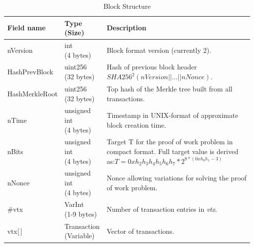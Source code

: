 \begin{table}[ht!]
	\centering
	\begin{tabular}{ | m{80pt} | >{\centering} m{60pt} | m{200pt} | }

		\hline
		\textbf{Field name} &
		\bigcell{c}{\textbf{Type} \\ \textbf{(Size)}} &
		\textbf{Description}\\ \hline\hline
    
		nVersion &
		\bigcell{c}{int \\ (4 bytes)} &
		Block format version (currently 2). \\ \hline
		
		HashPrevBlock &
		\bigcell{c}{uint256 \\ (32 bytes)} &
		Hash of previous block header \newline
		$SHA256^{2}(nVersion || \dots || nNonce)$. \\ \hline
	
		HashMerkleRoot &
		\bigcell{c}{uint256 \\ (32 bytes)} &
		Top hash of the Merkle tree built from all transactions. \\ \hline
		
		nTime &
		\bigcell{c}{unsigned int \\ (4 bytes)} &
		Timestamp in UNIX-format of approximate block creation time. \\ \hline
	
		nBits &
		\bigcell{c}{unsigned int \\ (4 bytes)} &
		Target T for the proof of work problem in compact format. Full target value is derived as:\newline$T = 0xh_{2}h_{3}h_{4}h_{5}h_{6}h_{7} * 2^{8*(0xh_{0}h_{1} - 3)}$\\ \hline
	
		nNonce &
		\bigcell{c}{unsigned int \\ (4 bytes)} &
		Nonce allowing variations for solving the proof of work problem.\\ \hline
	
		\#vtx &
		\bigcell{c}{VarInt \\ (1-9 bytes)} &
		Number of transaction entries in \textit{vtx}. \\ \hline
	
		vtx[\,] &
		\bigcell{c}{Transaction \\ (Variable)} &
		Vector of transactions. \\ \hline
	\end{tabular}
	
	\vspace{5pt}
	\caption{Block Structure}
	\label{table:CBlock}
\end{table}

